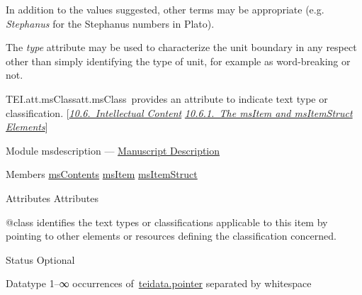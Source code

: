 \begin{reflist}
\begin{sansreflist}
\begin{reflist}
In addition to the values suggested, other terms may be appropriate (e.g. \textit{Stephanus} for the Stephanus numbers in Plato).\par
The {\itshape type} attribute may be used to characterize the unit boundary in any respect other than simply identifying the type of unit, for example as word-breaking or not.
\end{reflist}  
\end{sansreflist}  
\end{reflist}  
\begin{reflist}
\item[]\begin{specHead}{TEI.att.msClass}{att.msClass} provides an attribute to indicate text type or classification. [\textit{\hyperref[msco]{10.6.\ Intellectual Content}} \textit{\hyperref[mscoit]{10.6.1.\ The msItem and msItemStruct Elements}}]\end{specHead} 
    \item[{Module}]
  msdescription — \hyperref[MS]{Manuscript Description}
    \item[{Members}]
  \hyperref[TEI.msContents]{msContents} \hyperref[TEI.msItem]{msItem} \hyperref[TEI.msItemStruct]{msItemStruct}
    \item[{Attributes}]
  Attributes\hfil\\[-10pt]\begin{sansreflist}
    \item[@class]
  identifies the text types or classifications applicable to this item by pointing to other elements or resources defining the classification concerned. 
\begin{reflist}
    \item[{Status}]
  Optional
    \item[{Datatype}]
  1–∞ occurrences of \hyperref[TEI.teidata.pointer]{teidata.pointer} separated by whitespace
\end{reflist}  
\end{sansreflist}  
\end{reflist}  
